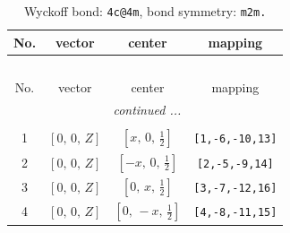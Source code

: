 \documentclass[fleqn,8pt]{jsarticle}
\begin{document}
\renewcommand{\arraystretch}{1.2}
\begin{longtable}{cccc}
\caption{Wyckoff bond: {\tt 4c@4m}, bond symmetry: {\tt m2m.}}
 \\
 \hline \hline
No. & vector & center & mapping \\ \hline \endfirsthead

\multicolumn{3}{l}{\tablename\ \thetable{}} \\
 \hline \hline
No. & vector & center & mapping \\ \hline \endhead

 \hline \hline
\multicolumn{3}{r}{\footnotesize\it continued ...} \\ \endfoot

 \hline \hline
\multicolumn{3}{r}{} \\ \endlastfoot

1 & $\left[ 0,\, 0,\, Z \right]$ & $\left[ x,\, 0,\, \frac{1}{2} \right]$ & {\tt [1,-6,-10,13]} \\ \hline
2 & $\left[ 0,\, 0,\, Z \right]$ & $\left[ - x,\, 0,\, \frac{1}{2} \right]$ & {\tt [2,-5,-9,14]} \\ \hline
3 & $\left[ 0,\, 0,\, Z \right]$ & $\left[ 0,\, x,\, \frac{1}{2} \right]$ & {\tt [3,-7,-12,16]} \\ \hline
4 & $\left[ 0,\, 0,\, Z \right]$ & $\left[ 0,\, - x,\, \frac{1}{2} \right]$ & {\tt [4,-8,-11,15]} \\
\end{longtable}
\renewcommand{\arraystretch}{1.2}
\end{document}
